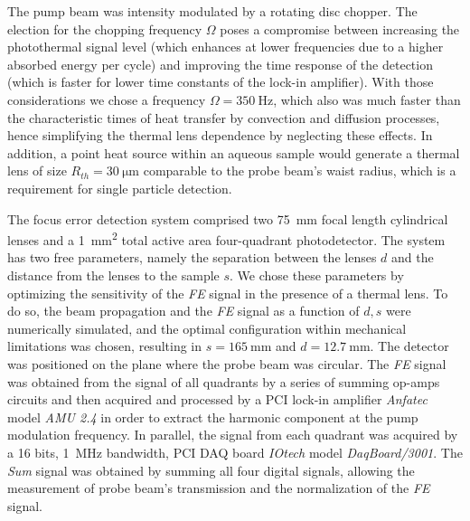 \documentclass[9pt,twocolumn,twoside]{osajnl}
\newcommand{\FE}{\textit{FE}}
\newcommand{\Sum}{\textit{Sum}}
\begin{document}
The pump beam was intensity modulated by a rotating disc chopper. The election for the chopping frequency $\Omega$ poses a compromise between increasing the photothermal signal level (which enhances at lower frequencies due to a higher absorbed energy per cycle) and improving the time response of the detection (which is faster for lower time constants of the lock-in amplifier). With those considerations we chose a frequency $\Omega = \SI{350}{\hertz}$, which also was much faster than the characteristic times of heat transfer by convection and diffusion processes, hence simplifying the thermal lens dependence by neglecting these effects. In addition, a point heat source within an aqueous sample would generate a thermal lens of size $R_{th} = \SI{30}{\micro\metre}$ comparable to the probe beam's waist radius, which is a requirement for single particle detection.



The focus error detection system comprised two \SI{75}{\milli\metre} focal length cylindrical lenses and a \SI{1}{\milli\metre^2} total active area four-quadrant photodetector. The system has two free parameters, namely the separation between the lenses $d$ and the distance from the lenses to the sample $s$. We chose these parameters by optimizing the sensitivity of the \FE{} signal in the presence of a thermal lens. To do so, the beam propagation and the \FE{} signal as a function of ${d,s}$ were numerically simulated, and the optimal configuration within mechanical limitations was chosen, resulting in $s = \SI{165}{\milli\metre}$ and $d = \SI{12.7}{\milli\metre}$. The detector was positioned on the plane where the probe beam was circular. The \FE{} signal was obtained from the signal of all quadrants by a series of summing op-amps circuits and then acquired and processed by a PCI lock-in amplifier \emph{Anfatec} model \emph{AMU 2.4} in order to extract the harmonic component at the pump modulation frequency. In parallel, the signal from each quadrant was acquired by a 16 bits, \SI{1}{\mega\hertz} bandwidth, PCI DAQ board \emph{IOtech} model \emph{DaqBoard/3001}. The \Sum{} signal was obtained by summing all four digital signals, allowing the measurement of probe beam's transmission and the normalization of the \FE{} signal. \\
\end{document}
